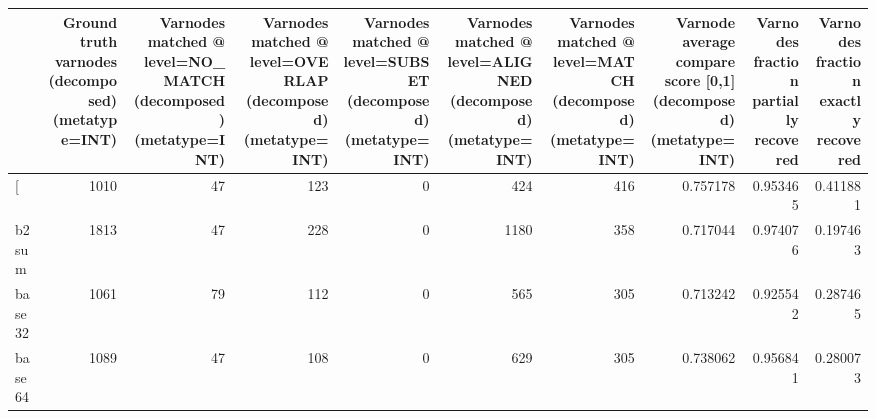 \begin{tabular}{lrrrrrrrrr}
\toprule
{} &  Ground truth varnodes (decomposed) (metatype=INT) &  Varnodes matched @ level=NO\_MATCH (decomposed) (metatype=INT) &  Varnodes matched @ level=OVERLAP (decomposed) (metatype=INT) &  Varnodes matched @ level=SUBSET (decomposed) (metatype=INT) &  Varnodes matched @ level=ALIGNED (decomposed) (metatype=INT) &  Varnodes matched @ level=MATCH (decomposed) (metatype=INT) &  Varnode average compare score [0,1] (decomposed) (metatype=INT) &  Varnodes fraction partially recovered &  Varnodes fraction exactly recovered \\
\midrule
[         &                                               1010 &                                                 47 &                                                123 &                                                  0 &                                                424 &                                                416 &                                           0.757178 &                               0.953465 &                             0.411881 \\
b2sum     &                                               1813 &                                                 47 &                                                228 &                                                  0 &                                               1180 &                                                358 &                                           0.717044 &                               0.974076 &                             0.197463 \\
base32    &                                               1061 &                                                 79 &                                                112 &                                                  0 &                                                565 &                                                305 &                                           0.713242 &                               0.925542 &                             0.287465 \\
base64    &                                               1089 &                                                 47 &                                                108 &                                                  0 &                                                629 &                                                305 &                                           0.738062 &                               0.956841 &                             0.280073 \\

\end{tabular}
